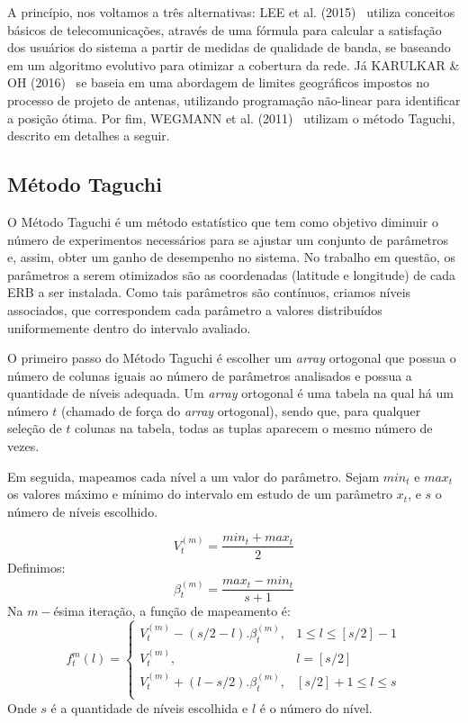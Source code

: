 \documentclass[]{politex}
\begin{document}
A princípio, nos voltamos a três alternativas: LEE et al. (2015)~
\cite{evolutivo} utiliza conceitos básicos de telecomunicações, através de uma
fórmula para calcular a satisfação dos usuários do sistema a partir de medidas
de qualidade de banda, se baseando em um algoritmo evolutivo para otimizar a
cobertura da rede. Já KARULKAR \& OH (2016)~\cite{nao-linear} se baseia em uma
abordagem de limites geográficos impostos no processo de projeto de antenas,
utilizando programação não-linear para identificar a posição ótima. Por fim,
WEGMANN et al. (2011)~\cite{taguchi} utilizam o método Taguchi, descrito em
detalhes a seguir.

\subsection{Método Taguchi}

O Método Taguchi é um método estatístico que tem como objetivo diminuir o número
de experimentos necessários para se ajustar um conjunto de parâmetros e, assim,
obter um ganho de desempenho no sistema. No trabalho em questão, os parâmetros a
serem otimizados são as coordenadas (latitude e longitude) de cada ERB a ser
instalada. Como tais parâmetros são contínuos, criamos níveis associados, que
correspondem cada parâmetro a valores distribuídos uniformemente dentro do
intervalo avaliado.

O primeiro passo do Método Taguchi é escolher um \textit{array} ortogonal que
possua o número de colunas iguais ao número de parâmetros analisados e possua a
quantidade de níveis adequada. Um \textit{array} ortogonal é uma tabela na qual
há um número $t$ (chamado de força do \textit{array} ortogonal), sendo que, para
qualquer seleção de $t$ colunas na tabela, todas as tuplas aparecem o mesmo
número de vezes.

Em seguida, mapeamos cada nível a um valor do parâmetro. Sejam $min_t$ e $max_t$
os valores máximo e mínimo do intervalo em estudo de um parâmetro $x_t$, e $s$ o
número de níveis escolhido.

\begin{equation}
    V_t^{(m)}=\frac{min_t+max_t}{2}
\end{equation}
Definimos:
\begin{equation}
    \beta_t^{(m)} = \frac{max_t-min_t}{s+1}
\end{equation}
Na $m-$ésima iteração, a função de mapeamento é:
\begin{equation}
    f_t^m(l) =
    \begin{cases}
        V_t^{(m)} - (s/2 - l).\beta_t^{(m)}, & 1 \leq l \leq [s/2] - 1 \\
        V_t^{(m)}, &  l = [s/2]\\
        V_t^{(m)} + (l - s/2).\beta_t^{(m)}, & [s/2] + 1 \leq l \leq s \\
    \end{cases}
\end{equation}
Onde $s$ é a quantidade de níveis escolhida e $l$ é o número do nível.
\end{document}
